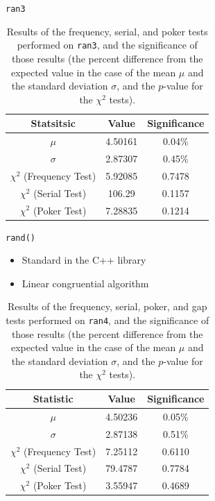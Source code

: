 \documentclass{beamer} %
\begin{document}
\begin{frame}{\texttt{ran3}}
\begin{table}[ht]
\begin{center}
\begin{tabular}{c|c|c} \hline
Statsitsic & Value & Significance\\\hline
$\mu$ & 4.50161 & 0.04\%\\
$\sigma$ & 2.87307 & 0.45\%\\
$\chi^{2}$ (Frequency Test) & 5.92085 & 0.7478\\
$\chi^{2}$ (Serial Test) & 106.29 & 0.1157\\
$\chi^{2}$ (Poker Test) & 7.28835 & 0.1214\\ \hline
\end{tabular}
\caption{Results of the frequency, serial, and poker tests performed on \texttt{ran3}, and the significance of those results (the percent difference from the expected value in the case of the mean $\mu$ and the standard deviation $\sigma$, and the $p$-value for the $\chi^{2}$ tests).}
\label{tab:ran3results}
\end{center}
\end{table}
\end{frame}

\begin{frame}{\texttt{rand()}}
\begin{itemize}
\item Standard in the C++ library
\item Linear congruential algorithm  
\end{itemize}

\begin{table}[ht]
\begin{center}
\begin{tabular}{c|c|c} \hline
Statistic & Value & Significance\\\hline
$\mu$ & 4.50236 & 0.05\%\\
$\sigma$ & 2.87138 & 0.51\%\\
$\chi^{2}$ (Frequency Test) & 7.25112 & 0.6110 \\
$\chi^{2}$ (Serial Test) & 79.4787 & 0.7784 \\
$\chi^{2}$ (Poker Test) & 3.55947 & 0.4689 \\ \hline
\end{tabular}
\caption{Results of the frequency, serial, poker, and gap tests performed on \texttt{ran4}, and the significance of those results (the percent difference from the expected value in the case of the mean $\mu$ and the standard deviation $\sigma$, and the $p$-value for the $\chi^{2}$ tests).}
\label{tab:ran4results}
\end{center}
\end{table}
\end{frame}
\end{document}

